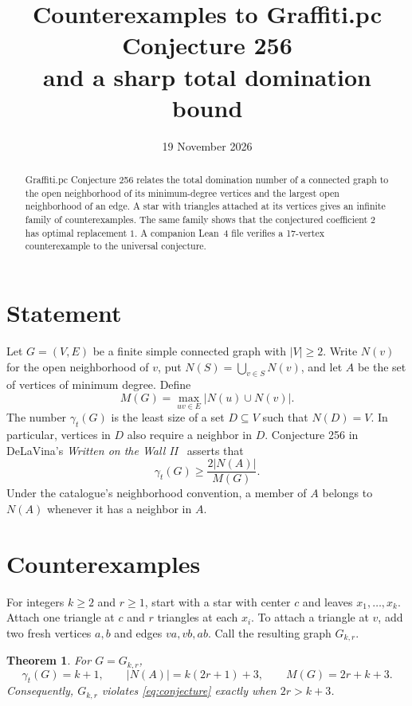 \documentclass[11pt]{article}
\title{Counterexamples to Graffiti.pc Conjecture 256\\
and a sharp total domination bound}
\author{}
\date{19 November 2026}
\newtheorem{theorem}{Theorem}
\newcommand{\gt}{\gamma_t}
\begin{document}
\maketitle

\begin{abstract}
Graffiti.pc Conjecture 256 relates the total domination number of a
connected graph to the open neighborhood of its minimum-degree vertices
and the largest open neighborhood of an edge. A star with triangles
attached at its vertices gives an infinite family of counterexamples.
The same family shows that the conjectured coefficient \(2\) has optimal
replacement \(1\). A companion Lean~4 file verifies a 17-vertex
counterexample to the universal conjecture.
\end{abstract}

\section{Statement}

Let \(G=(V,E)\) be a finite simple connected graph with \(|V|\ge2\).
Write \(N(v)\) for the open neighborhood of \(v\), put
\(N(S)=\bigcup_{v\in S}N(v)\), and let \(A\) be the set of vertices of
minimum degree. Define
\[
M(G)=\max_{uv\in E}|N(u)\cup N(v)|.
\]
The number \(\gt(G)\) is the least size of a set \(D\subseteq V\)
such that \(N(D)=V\). In particular, vertices in \(D\) also require
a neighbor in \(D\).
Conjecture 256 in DeLaVina's \emph{Written on the Wall II}~\cite[pp.~148--149]{wow}
asserts that
\begin{equation}\label{eq:conjecture}
\gt(G)\ge \frac{2|N(A)|}{M(G)}.
\end{equation}
Under the catalogue's neighborhood convention, a member of \(A\)
belongs to \(N(A)\) whenever it has a neighbor in \(A\).

\section{Counterexamples}

For integers \(k\ge2\) and \(r\ge1\), start with a star with center \(c\)
and leaves \(x_1,\dots,x_k\). Attach one triangle at \(c\) and \(r\)
triangles at each \(x_i\). To attach a triangle at \(v\), add two fresh
vertices \(a,b\) and edges \(va,vb,ab\). Call the resulting graph \(G_{k,r}\).

\begin{theorem}\label{thm:family}
For \(G=G_{k,r}\),
\[
\gt(G)=k+1,\qquad |N(A)|=k(2r+1)+3,\qquad M(G)=2r+k+3.
\]
Consequently, \(G_{k,r}\) violates \eqref{eq:conjecture} exactly when
\(2r>k+3\).
\end{theorem}
\end{document}
